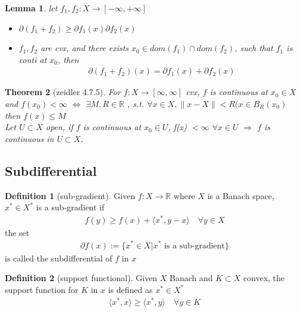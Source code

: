 \documentclass[a4paper,12pt,oneside,fleqn]{book}
\newtheorem{theorem}{Theorem}[section]
\newtheorem{lemma}[theorem]{Lemma}
\theoremstyle{definition}
\newtheorem{definition}{Definition}[section]
\theoremstyle{remark}
\begin{document}
\begin{lemma}
	let $f_1, f_2: X \rightarrow [-\infty, + \infty]$
	\begin{itemize}
		\item  $\partial(f_1 + f_2) \geq \partial f_1(x) \partial f_2(x)$
		\item $f_1, f_2$ are cvx, and there exists $x_0 \in dom(f_1) \cap dom(f_2)$, such that $f_1$ is conti at $x_0$, then
		\begin{align*}
			\partial (f_1 + f_2)(x) = \partial f_1(x) + \partial f_2(x)
		\end{align*}
	\end{itemize}
\end{lemma}

\begin{theorem}[zeidler 4.7.5]
	For $f: X \rightarrow [\infty, \infty]$ cvx, $f$ is continuous at $x_0 \in X$ and $f(x_0)< \infty$ $\Leftrightarrow$
	$\exists M, R \in \mathbb{R}$ , s.t. $\forall x \in X, \|x - X\|< R(x \in B_R(x_0)$ then $f(x) \le M$ \\
	Let $U \subset X$ open, if $f$ is continuous at $x_0 \in U$, f(x) $< \infty$ $\forall x \in U$ $\Rightarrow$ $f$ is continuous in $U \subset X$. 
\end{theorem}




\subsection{Subdifferential}
\begin{definition}[sub-gradient]
	Given $f: X \rightarrow \mathbb{R}$ where $X$ is a Banach space, $x^* \in X^*$ is a sub-gradient if
	\begin{align*}
		f(y) \geq f(x) + \langle x^*, y - x \rangle \quad \forall y \in X
	\end{align*}
	the set
	\begin{align*}
		\partial f(x) := \{ x^* \in X| x^* \text{ is a sub-gradient} \}
	\end{align*}
	is called the subdifferential of $f$ in $x$
\end{definition}

\begin{definition}[support functional]
	Given $X$ Banach and $K \subset X$ convex, the support function for $K$ in $x$ is defined as $x^* \in X^*$
	\begin{align*}
		\langle x^*, x \rangle \ge \langle x^*, y \rangle \quad \forall y \in K   
	\end{align*}
\end{definition}
\end{document}

